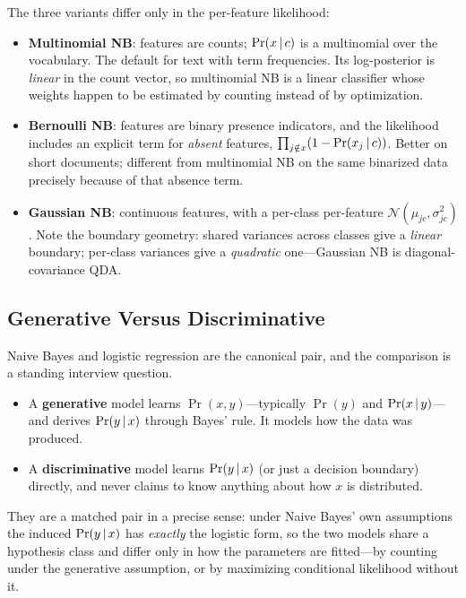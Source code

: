 The three variants differ only in the per-feature likelihood:
\begin{itemize}
    \item \textbf{Multinomial NB}: features are counts; $\Pr(x\,|\, c)$ is a multinomial over the vocabulary. The default for text with term frequencies. Its log-posterior is \emph{linear} in the count vector, so multinomial NB is a linear classifier whose weights happen to be estimated by counting instead of by optimization.
    \item \textbf{Bernoulli NB}: features are binary presence indicators, and the likelihood includes an explicit term for \emph{absent} features, $\prod_{j \notin x}(1 - \Pr(x_j\,|\, c))$. Better on short documents; different from multinomial NB on the same binarized data precisely because of that absence term.
    \item \textbf{Gaussian NB}: continuous features, with a per-class per-feature $\mathcal{N}(\mu_{jc}, \sigma_{jc}^2)$. Note the boundary geometry: shared variances across classes give a \emph{linear} boundary; per-class variances give a \emph{quadratic} one---Gaussian NB is diagonal-covariance QDA.
\end{itemize}

\subsection{Generative Versus Discriminative}

Naive Bayes and logistic regression are the canonical pair, and the comparison is a standing interview question.

\begin{itemize}
    \item A \textbf{generative} model learns $\Pr(x, y)$---typically $\Pr(y)$ and $\Pr(x\,|\, y)$---and derives $\Pr(y\,|\, x)$ through Bayes' rule. It models how the data was produced.
    \item A \textbf{discriminative} model learns $\Pr(y\,|\, x)$ (or just a decision boundary) directly, and never claims to know anything about how $x$ is distributed.
\end{itemize}

They are a matched pair in a precise sense: under Naive Bayes' own assumptions the induced $\Pr(y\,|\, x)$ has \emph{exactly} the logistic form, so the two models share a hypothesis class and differ only in how the parameters are fitted---by counting under the generative assumption, or by maximizing conditional likelihood without it.

